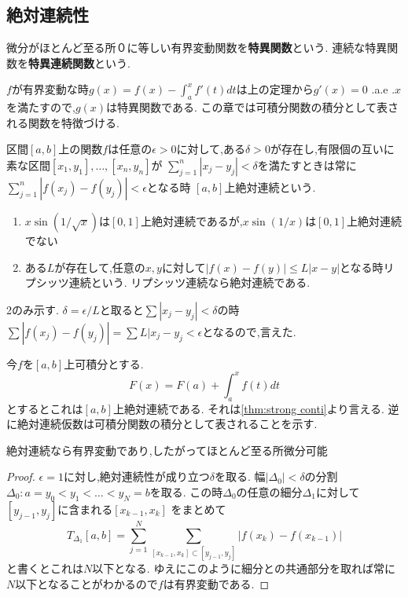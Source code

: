 \subsection{絶対連続性}

\begin{dfn}
微分がほとんど至る所０に等しい有界変動関数を\textbf{特異関数}という.
連続な特異関数を\textbf{特異連続関数}という.
\end{dfn}

$f$が有界変動な時$g(x) = f(x) - \int_a^xf'(t) dt$は上の定理から$g'(x) = 0$ .a.e .$x$を満たすので,$g(x)$は特異関数である.
この章では可積分関数の積分として表される関数を特徴づける.


\begin{dfn}
区間$[a, b]$上の関数$f$は任意の$\epsilon > 0$に対して,ある$\delta > 0$が存在し,有限個の互いに素な区間$[x_1, y_1] , \ldots ,[x_n, y_n]$が
$\sum_{j=1}^n | x_j - y_j| < \delta$を満たすときは常に$\sum_{j=1}^n | f(x_j) - f(y_j)| < \epsilon$となる時
$[a,b]$上絶対連続という.
\end{dfn}

\begin{epl}
\begin{enumerate}
    \item  $x \sin(1/ \sqrt{x})$は$[0, 1]$上絶対連続であるが,$x \sin(1/ x)$は$[0, 1]$上絶対連続でない
    \item ある$L$が存在して,任意の$x, y$に対して$|f(x) - f(y) | \le L |x-y|$となる時リプシッツ連続という.
    リプシッツ連続なら絶対連続である.
\end{enumerate}
\end{epl}
2のみ示す.
$\delta = \epsilon / L$と取ると$\sum |x_j - y_j| < \delta$の時
$\sum |f(x_j) - f(y_j) | =  \sum L |x_j -y_j < \epsilon$となるので,言えた.

今$f$を$[a, b]$上可積分とする.
\begin{equation*}
    F(x) = F(a) + \int_a^x f(t) dt
\end{equation*}
とするとこれは$[a, b]$上絶対連続である.
それは\ref{thm:strong conti}より言える.
逆に絶対連続仮数は可積分関数の積分として表されることを示す.

\begin{lem}
絶対連続なら有界変動であり,したがってほとんど至る所微分可能
\end{lem}
\begin{proof}
$\epsilon =1$に対し,絶対連続性が成り立つ$\delta$を取る.
幅$|\Delta_0| < \delta$の分割$\Delta_0: a=y_0 < y_1 < \ldots < y_N=b$を取る.
この時$\Delta_0$の任意の細分$\Delta_1$に対して$[y_{j-1}, y_j]$に含まれる$[x_{k-1}, x_k]$ をまとめて
\begin{equation*}
T_{\Delta_1}[a, b] = \sum_{j=1}^N \sum_{[x_{k-1}, x_{k}] \subset [y_{j-1}, y_{j}]}| f(x_k) - f(x_{k-1})|
\end{equation*}
と書くとこれは$N$以下となる.
ゆえにこのように細分との共通部分を取れば常に$N$以下となることがわかるので$f$は有界変動である.
\end{proof}

